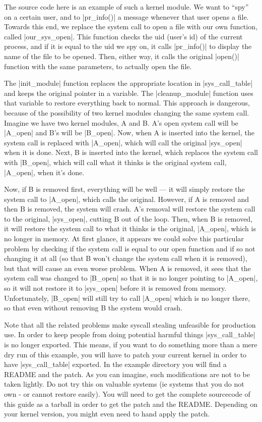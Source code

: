 \documentclass[10pt, oneside]{book}
\begin{document}
The source code here is an example of such a kernel module.
We want to ``spy'' on a certain user, and to \cpp|pr_info()| a message whenever that user opens a file.
Towards this end, we replace the system call to open a file with our own function, called \cpp|our_sys_open|.
This function checks the uid (user's id) of the current process, and if it is equal to the uid we spy on, it calls \cpp|pr_info()| to display the name of the file to be opened.
Then, either way, it calls the original \cpp|open()| function with the same parameters, to actually open the file.

The \cpp|init_module| function replaces the appropriate location in \cpp|sys_call_table| and keeps the original pointer in a variable.
The \cpp|cleanup_module| function uses that variable to restore everything back to normal.
This approach is dangerous, because of the possibility of two kernel modules changing the same system call.
Imagine we have two kernel modules, A and B. A's open system call will be \cpp|A_open| and B's will be \cpp|B_open|.
Now, when A is inserted into the kernel, the system call is replaced with \cpp|A_open|, which will call the original \cpp|sys_open| when it is done.
Next, B is inserted into the kernel, which replaces the system call with \cpp|B_open|, which will call what it thinks is the original system call, \cpp|A_open|, when it's done.

Now, if B is removed first, everything will be well --- it will simply restore the system call to \cpp|A_open|, which calls the original.
However, if A is removed and then B is removed, the system will crash.
A's removal will restore the system call to the original, \cpp|sys_open|, cutting B out of the loop.
Then, when B is removed, it will restore the system call to what it thinks is the original, \cpp|A_open|, which is no longer in memory.
At first glance, it appears we could solve this particular problem by checking if the system call is equal to our open function and if so not changing it at all (so that B won't change the system call when it is removed), but that will cause an even worse problem.
When A is removed, it sees that the system call was changed to \cpp|B_open| so that it is no longer pointing to \cpp|A_open|, so it will not restore it to \cpp|sys_open| before it is removed from memory.
Unfortunately, \cpp|B_open| will still try to call \cpp|A_open| which is no longer there, so that even without removing B the system would crash.

Note that all the related problems make syscall stealing unfeasible for production use.
In order to keep people from doing potential harmful things \cpp|sys_call_table| is no longer exported.
This means, if you want to do something more than a mere dry run of this example, you will have to patch your current kernel in order to have \cpp|sys_call_table| exported.
In the example directory you will find a README and the patch.
As you can imagine, such modifications are not to be taken lightly.
Do not try this on valuable systems (ie systems that you do not own - or cannot restore easily).
You will need to get the complete sourcecode of this guide as a tarball in order to get the patch and the README.
Depending on your kernel version, you might even need to hand apply the patch.
\end{document}
